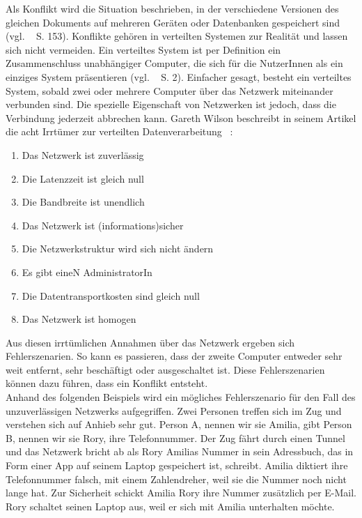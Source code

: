 Als Konflikt wird die Situation beschrieben, in der verschiedene Versionen des gleichen Dokuments auf mehreren Geräten oder Datenbanken gespeichert sind (vgl. ~\cite{couchDB} S. 153).
Konflikte gehören in verteilten Systemen zur Realität und lassen sich nicht vermeiden.
Ein verteiltes System ist per Definition ein Zusammenschluss unabhängiger Computer, die sich für die NutzerInnen als ein einziges System präsentieren (vgl. ~\cite{tanenbaum} S. 2).
Einfacher gesagt, besteht ein verteiltes System, sobald zwei oder mehrere Computer über das Netzwerk miteinander verbunden sind.
Die spezielle Eigenschaft von Netzwerken ist jedoch, dass die Verbindung jederzeit abbrechen kann.
Gareth Wilson beschreibt in seinem Artikel die acht Irrtümer zur verteilten Datenverarbeitung ~\cite{fallacies}:
\begin{enumerate}
  \item Das Netzwerk ist zuverlässig
  \item Die \gls{Latenz}zeit ist gleich null
  \item Die Bandbreite ist unendlich
  \item Das Netzwerk ist (informations)sicher
  \item Die Netzwerkstruktur wird sich nicht ändern
  \item Es gibt eineN AdministratorIn
  \item Die Datentransportkosten sind gleich null
  \item Das Netzwerk ist homogen
\end{enumerate}
Aus diesen irrtümlichen Annahmen über das Netzwerk ergeben sich Fehlerszenarien. So kann es passieren, dass der zweite Computer entweder sehr weit entfernt, sehr beschäftigt oder ausgeschaltet ist. Diese Fehlerszenarien können dazu führen, dass ein Konflikt entsteht.\\
Anhand des folgenden Beispiels wird ein mögliches Fehlerszenario für den Fall des unzuverlässigen Netzwerks aufgegriffen.
Zwei Personen treffen sich im Zug und verstehen sich auf Anhieb sehr gut. Person A, nennen wir sie Amilia, gibt Person B, nennen wir sie Rory, ihre Telefonnummer. Der Zug fährt durch einen Tunnel und das Netzwerk bricht ab als Rory Amilias Nummer in sein Adressbuch, das in Form einer \gls{App} auf seinem Laptop gespeichert ist, schreibt.
Amilia diktiert ihre Telefonnummer falsch, mit einem Zahlendreher, weil sie die Nummer noch nicht lange hat.
Zur Sicherheit schickt Amilia Rory ihre Nummer zusätzlich per E-Mail. Rory schaltet seinen Laptop aus, weil er sich mit Amilia unterhalten möchte.

